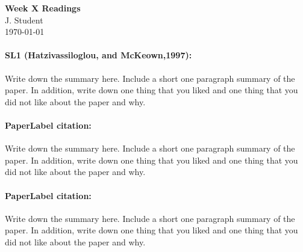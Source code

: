 \documentclass[12pt]{article}
\begin{document}
\begin{center}
  \textbf{Week X Readings} \\
  J. Student \\
  \today
\end{center}

\paragraph{{\bf SL1 (Hatzivassiloglou, and McKeown,1997):} }
Write down the summary here. Include a short one paragraph summary of the paper. In addition, write down 
 one thing that you liked and one thing that you did not like about the paper and why.

\paragraph{{\bf PaperLabel citation}: }  Write down the summary here. Include a short one paragraph summary of the paper. In addition, write down 
 one thing that you liked and one thing that you did not like about the paper and why.

\paragraph{{\bf PaperLabel  citation}: } Write down the summary here. Include a short one paragraph summary of the paper. In addition, write down 
 one thing that you liked and one thing that you did not like about the paper and why.
\end{document}
